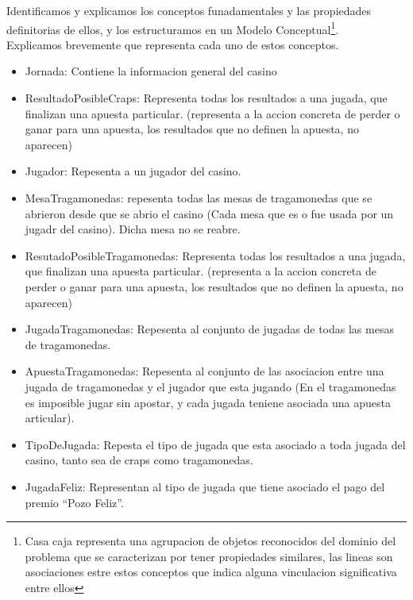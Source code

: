 Identificamos y explicamos los conceptos funadamentales y las propiedades definitorias de ellos, y los estructuramos en un Modelo Conceptual\footnote{Casa caja representa una agrupacion de objetos reconocidos del dominio del problema que se caracterizan por tener propiedades similares, las lineas son asociaciones estre estos conceptos que indica alguna vinculacion significativa entre ellos}.\\
Explicamos brevemente que representa cada uno de estos conceptos.

\begin{itemize}

	\item Jornada: Contiene la informacion general del casino

	\item ResultadoPosibleCraps: Representa todas los resultados a una jugada, que finalizan una apuesta particular. (representa a la accion concreta de perder o ganar para una apuesta, los resultados que no definen la apuesta, no aparecen)

	\item Jugador: Repesenta a un jugador del casino.

	\item MesaTragamonedas: repesenta todas las mesas de tragamonedas que se abrieron desde que se abrio el casino (Cada mesa que es o fue usada por un jugadr del casino). Dicha mesa no se reabre.

	\item ResutadoPosibleTragamonedas: Representa todas los resultados a una jugada, que finalizan una apuesta particular. (representa a la accion concreta de perder o ganar para una apuesta, los resultados que no definen la apuesta, no aparecen)

	\item JugadaTragamonedas: Repesenta al conjunto de jugadas de todas las mesas de tragamonedas.

	\item ApuestaTragamonedas: Repesenta al conjunto de las asociacion entre una jugada de tragamonedas y el jugador que esta jugando (En el tragamonedas es imposible jugar sin apostar, y cada jugada teniene asociada una apuesta articular).

	\item TipoDeJugada: Repesta el tipo de jugada que esta asociado a toda jugada del casino, tanto sea de craps como tragamonedas.

	\item JugadaFeliz: Representan al tipo de jugada que tiene asociado el pago del premio ``Pozo Feliz''.


\end{itemize}
